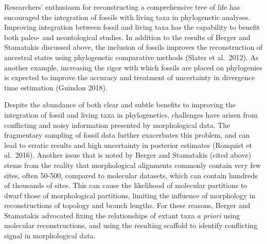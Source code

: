 \documentclass[12pt]{article}
\begin{document}
Researchers' enthusiasm for reconstructing a comprehensive tree of life
has encouraged the integration of fossils with living taxa in
phylogenetic analyses. Improving integration between fossil and living
taxa has the capability to benefit both paleo- and neontological
studies. In addition to the results of Berger and Stamatakis discussed
above, the inclusion of fossils improves the reconstruction of ancestral
states using phylogenetic comparative methods (Slater et al.~2012). As
another example, increasing the rigor with which fossils are placed on
phylogenies is expected to improve the accuracy and treatment of
uncertainty in divergence time estimation (Guindon 2018).

Despite the abundance of both clear and subtle benefits to improving the
integration of fossil and living taxa in phylogenetics, challenges have
arisen from conflicting and noisy information presented by morphological
data. The fragmentary sampling of fossil data further exacerbates this
problem, and can lead to erratic results and high uncertainty in
posterior estimates (Ronquist et al.~2016). Another issue that is noted
by Berger and Stamatakis (cited above) stems from the reality that
morphological alignments commonly contain very few sites, often 50-500,
compared to molecular datasets, which can contain hundreds of thousands
of sites. This can cause the likelihood of molecular partitions to dwarf
those of morphological partitions, limiting the influence of morphology
in reconstructions of topology and branch lengths. For these reasons,
Berger and Stamatakis advocated fixing the relationships of extant taxa
\emph{a priori} using molecular reconstructions, and using the resulting
scaffold to identify conflicting signal in morphological data.
\end{document}
